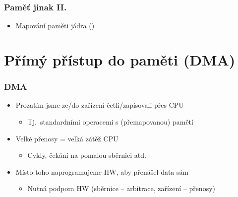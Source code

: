 


\subtitle{X. DMA}
\date{3. 12. \the\year}



\begin{frame}
  \titlepage
\end{frame}


\begin{frame}
  \frametitle{Paměť jinak II.}


  \bigskip

  \begin{itemize}
  \item Mapování paměti jádra ()
  \end{itemize}

  \tableofcontents

\end{frame}

\section{Přímý přístup do paměti (DMA)}
\frame{\sectionpage}

\begin{frame}
  \frametitle{DMA}

  \begin{itemize}
    \item Prozatím jsme ze/do zařízení četli/zapisovali přes CPU
    \begin{itemize}
      \item Tj.\ standardními operacemi s (přemapovanou) pamětí
    \end{itemize}

    \pause

    \item Velké přenosy = velká zátěž CPU
    \begin{itemize}
      \item Cykly, čekání na pomalou sběrnici atd.
    \end{itemize}

    \pause

    \item Místo toho naprogramujeme HW, aby přenášel data sám
    \begin{itemize}
      \item Nutná podpora HW (sběrnice -- arbitrace, zařízení -- přenosy)
    \end{itemize}
  \end{itemize}

\end{frame}

